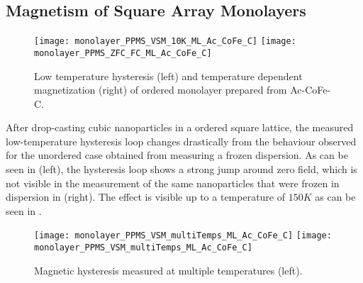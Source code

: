 \documentclass[\main/dresen_thesis.tex]{subfiles}
\renewcommand{\thisPath}{\main/chapters/monolayers/magneticStructure}
\begin{document}
  \subsection{Magnetism of Square Array Monolayers}
  \begin{figure}[tb]
    \centering
    \texttt{[image: monolayer\_PPMS\_VSM\_10K\_ML\_Ac\_CoFe\_C]}
    \texttt{[image: monolayer\_PPMS\_ZFC\_FC\_ML\_Ac\_CoFe\_C]}
    \caption{\label{fig:monolayer:magneticStructure:ppms}Low temperature hysteresis (left) and temperature dependent magnetization (right) of ordered monolayer prepared from Ac-CoFe-C.}
  \end{figure}
  After drop-casting cubic nanoparticles in a ordered square lattice, the measured low-temperature hysteresis loop changes drastically from the behaviour observed for the unordered case obtained from measuring a frozen dispersion.
  As can be seen in  (left), the hysteresis loop shows a strong jump around zero field, which is not visible in the measurement of the same nanoparticles that were frozen in dispersion in  (right).
  The effect is visible up to a temperature of $150 \unit{K}$ as can be seen in .
  \begin{figure}[tb]
    \centering
    \texttt{[image: monolayer\_PPMS\_VSM\_multiTemps\_ML\_Ac\_CoFe\_C]}
    \texttt{[image: monolayer\_PPMS\_VSM\_multiTemps\_ML\_Ac\_CoFe\_C]}
    \caption{\label{fig:monolayer:magneticStructure:ppmsMultiT}Magnetic hysteresis measured at multiple temperatures (left).}
  \end{figure}
  




\end{document}
